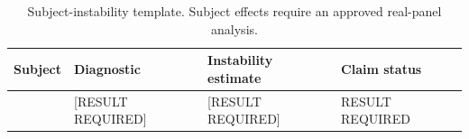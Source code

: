 \begin{table}[t]
\centering
\caption{Subject-instability template. Subject effects require an approved real-panel analysis.}
\begin{tabular}{llll}
\toprule
Subject & Diagnostic & Instability estimate & Claim status \\
\midrule
[RESULT REQUIRED] & [RESULT REQUIRED] & [RESULT REQUIRED] & RESULT REQUIRED \\
\bottomrule
\end{tabular}
\end{table}

